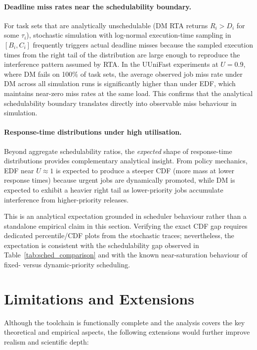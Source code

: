 \documentclass[12pt,a4paper]{article}
\begin{document}
\paragraph{Deadline miss rates near the schedulability boundary.}
For task sets that are analytically unschedulable (DM RTA returns \(R_i > D_i\) for some \(\tau_i\)), stochastic simulation with log-normal execution-time sampling in \([B_i, C_i]\) frequently triggers actual deadline misses because the sampled execution times from the right tail of the distribution are large enough to reproduce the interference pattern assumed by RTA. In the UUniFast experiments at \(U = 0.9\), where DM fails on 100\% of task sets, the average observed job miss rate under DM across all simulation runs is significantly higher than under EDF, which maintains near-zero miss rates at the same load. This confirms that the analytical schedulability boundary translates directly into observable miss behaviour in simulation.

\paragraph{Response-time distributions under high utilisation.}
Beyond aggregate schedulability ratios, the \emph{expected} shape of response-time distributions provides complementary analytical insight. From policy mechanics, EDF near \(U \approx 1\) is expected to produce a steeper CDF (more mass at lower response times) because urgent jobs are dynamically promoted, while DM is expected to exhibit a heavier right tail as lower-priority jobs accumulate interference from higher-priority releases.

This is an analytical expectation grounded in scheduler behaviour rather than a standalone empirical claim in this section. Verifying the exact CDF gap requires dedicated percentile/CDF plots from the stochastic traces; nevertheless, the expectation is consistent with the schedulability gap observed in Table~\ref{tab:sched_comparison} and with the known near-saturation behaviour of fixed- versus dynamic-priority scheduling.

\section{Limitations and Extensions}

Although the toolchain is functionally complete and the analysis covers the key theoretical and empirical aspects, the following extensions would further improve realism and scientific depth:
\end{document}
